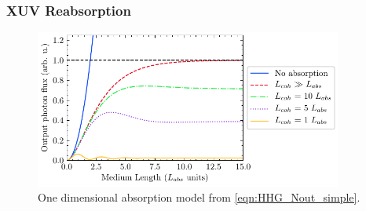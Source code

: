 \subsubsection{XUV Reabsorption}
\label{sec:XUV_reabsorption}

\begin{figure}
	\centering
	\includegraphics[width=0.9\textwidth]{figures/chap1/Constant1999_fig1.pdf}
	\caption{One dimensional absorption model from \cref{eqn:HHG_Nout_simple}.}
	\label{fig:Constant1999_fig1}
\end{figure}

